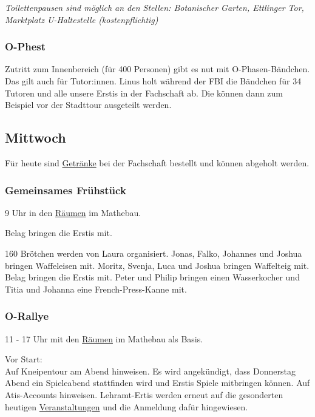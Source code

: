 \documentclass[10pt,ngerman]{scrartcl}
\begin{document}
\begin{multicols}{2}
\emph{Toilettenpausen sind möglich an den Stellen: Botanischer Garten, Ettlinger Tor, Marktplatz U-Haltestelle (kostenpflichtig)}

\subsubsection{O-Phest}

Zutritt zum Innenbereich (für 400 Personen) gibt es nut mit O-Phasen-Bändchen.
Das gilt auch für Tutor:innen.
Linus holt während der FBI die Bändchen für 34 Tutoren und alle unsere Erstis in der Fachschaft ab.
Die können dann zum Beispiel vor der Stadttour ausgeteilt werden.

\subsection{Mittwoch}

Für heute sind \hyperref[drinks]{Getränke} bei der Fachschaft bestellt und können abgeholt werden.

\subsubsection{Gemeinsames Frühstück}

9 Uhr in den \hyperref[rooms]{Räumen} im Mathebau.

Belag bringen die Erstis mit.

160 Brötchen werden von Laura organisiert. Jonas, Falko, Johannes
und Joshua bringen Waffeleisen mit. Moritz, Svenja, Luca und Joshua
bringen Waffelteig mit. Belag bringen die Erstis mit. Peter und Philip
bringen einen Wasserkocher und Titia und Johanna eine French-Press-Kanne
mit.

\subsubsection{O-Rallye}

11 - 17 Uhr mit den \hyperref[rooms]{Räumen} im Mathebau als Basis.

Vor Start: \\
Auf Kneipentour am Abend hinweisen.
Es wird angekündigt, dass Donnerstag Abend ein Spieleabend stattfinden wird und Erstis Spiele mitbringen können.
Auf Atis-Accounts hinweisen.
Lehramt-Ertis werden erneut auf die gesonderten heutigen \hyperref[lehramt]{Veranstaltungen} und die Anmeldung dafür hingewiesen.


\end{multicols}
\end{document}

